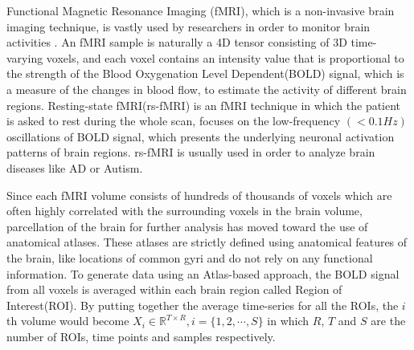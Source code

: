 \documentclass[journal]{IEEEtran}
\begin{document}
	
	Functional Magnetic Resonance Imaging (fMRI)\cite{r23}, which is a non-invasive brain imaging technique, is vastly used by researchers in order to monitor brain activities \cite{r04}.
%	
	An fMRI sample is naturally a 4D tensor consisting of 3D time-varying voxels, and each voxel contains an intensity value that is proportional to the strength of the Blood Oxygenation Level Dependent(BOLD) signal, which is a measure of the changes in blood flow, to estimate the activity of different brain regions.
	Resting-state fMRI(rs-fMRI) is an fMRI technique in which the patient is asked to rest during the whole scan, focuses on the low-frequency $\left( < 0.1 Hz \right)$  oscillations of BOLD signal, which presents the underlying neuronal activation patterns of brain regions. rs-fMRI is usually used in order to analyze brain diseases like AD or Autism\cite{r33,r34}.

	
	Since each fMRI volume consists of hundreds of thousands of voxels which are often highly correlated with the surrounding voxels in the brain volume, parcellation of the brain for further analysis has moved toward the use
	of anatomical atlases. These atlases are strictly defined using
	anatomical features of the brain, like locations of common gyri
	and do not rely on any functional information.
	To generate data
	using an Atlas-based approach, the BOLD signal from all voxels is averaged within each brain region called Region of Interest(ROI)\cite{r09}.
	By putting together the average time-series for all the ROIs, the $i$th volume would become $X_i \in \mathbb{R}^{T \times R} , i = \{1,2,\cdots, S\}$ in which $R$, $T$ and $S$ are the number of ROIs, time points and samples respectively.
	 
	
	
\end{document}
